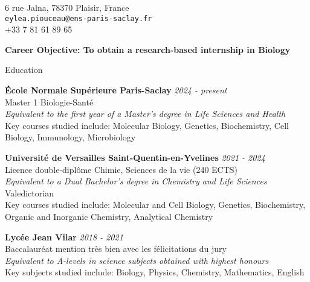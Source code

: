 \documentclass[
	10pt,
]{style} %
\begin{document}
\begin{center}
	6 rue Jalna, 78370 Plaisir, France \\
	\texttt{eylea.piouceau@ens-paris-saclay.fr} \\
	+33 7 81 61 89 65 \\
\end{center}

\begin{center}
	\textbf{Career Objective: To obtain a research-based internship in Biology}
\end{center}


\begin{rSection}{Education}

	\textbf{École Normale Supérieure Paris-Saclay} \hfill \textit{2024 - present} \\
	Master 1 Biologie-Santé \\
	\textit{Equivalent to the first year of a Master's degree in Life Sciences and Health} \\
	Key courses studied include: Molecular Biology, Genetics, Biochemistry, Cell Biology, Immunology, Microbiology

	\textbf{Université de Versailles Saint-Quentin-en-Yvelines} \hfill \textit{2021 - 2024} \\
	Licence double-diplôme Chimie, Sciences de la vie (240 ECTS) \\
	\textit{Equivalent to a Dual Bachelor's degree in Chemistry and Life Sciences} \\
	Valedictorian \\
	Key courses studied include: Molecular and Cell Biology, Genetics, Biochemistry, Organic and Inorganic Chemistry, Analytical Chemistry

	\textbf{Lycée Jean Vilar} \hfill \textit{2018 - 2021} \\
	Baccalauréat mention très bien avec les félicitations du jury \\
	\textit{Equivalent to A-levels in science subjects obtained with highest honours} \\
	Key subjects studied include: Biology, Physics, Chemistry, Mathematics, English

\end{rSection}

\end{document}
